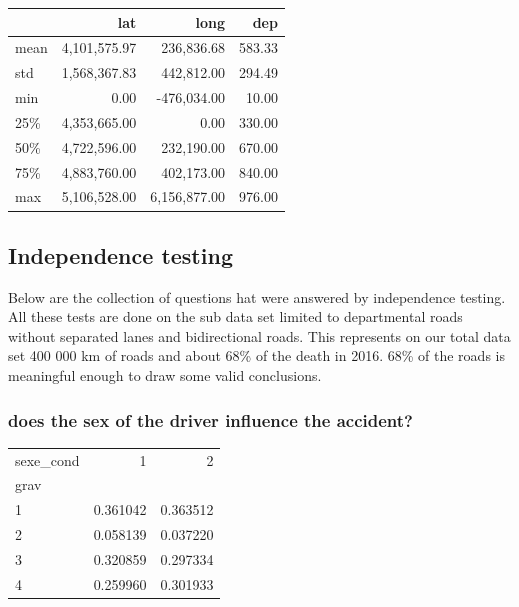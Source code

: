 \documentclass[a4paper]{article}
\theoremstyle{definition}
\theoremstyle{proposition}
\begin{document}
\begin{tabular}{lrrr}
\toprule
{} &          lat &         long &       dep \\
\midrule
mean  & 4,101,575.97 &   236,836.68 &    583.33 \\
std   & 1,568,367.83 &   442,812.00 &    294.49 \\
min   &         0.00 &  -476,034.00 &     10.00 \\
25\%   & 4,353,665.00 &         0.00 &    330.00 \\
50\%   & 4,722,596.00 &   232,190.00 &    670.00 \\
75\%   & 4,883,760.00 &   402,173.00 &    840.00 \\
max   & 5,106,528.00 & 6,156,877.00 &    976.00 \\
\bottomrule
\end{tabular}

\vspace{0.5cm}

\subsection{Independence testing}\label{Independence_testing}

Below are the collection of questions hat were answered by independence testing. All these tests are done on the sub data set limited to departmental roads without separated lanes and bidirectional roads. This represents on our total data set 400 000 km of roads and about 68\% of the death in 2016. 68\% of the roads is meaningful enough to draw some valid conclusions.


\subsubsection{does the sex of the driver influence the accident?}

\begin{tabular}{lrr}
\toprule
sexe\_cond &         1 &         2 \\
grav &           &           \\
\midrule
1    &  0.361042 &  0.363512 \\
2    &  0.058139 &  0.037220 \\
3    &  0.320859 &  0.297334 \\
4    &  0.259960 &  0.301933 \\
\bottomrule
\end{tabular}
\end{document}
